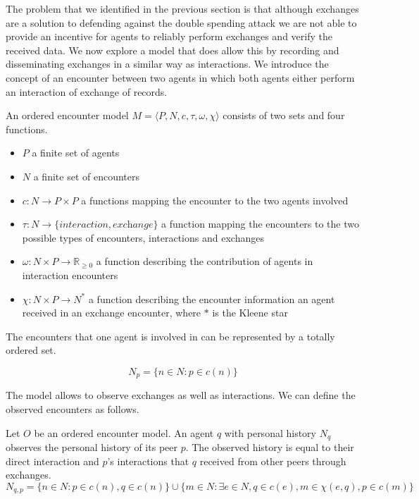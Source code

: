 The problem that we identified in the previous section is that although exchanges are a solution to
defending against the double spending attack we are not able to provide an incentive for agents to 
reliably perform exchanges and verify the received data. We now explore a model that does allow this
by recording and disseminating exchanges in a similar way as interactions. We introduce the concept
of an encounter between two agents in which both agents either perform an interaction of exchange 
of records.

\begin{defn}
    An ordered encounter model $M = \langle P, N, c, \tau, \omega, \chi \rangle$ consists of two 
    sets and four functions.
    \begin{itemize}
        \item $P$ a finite set of agents
        \item $N$ a finite set of encounters
        \item $c : N \rightarrow P \times P$ a functions mapping the encounter to the two agents involved
        \item $\tau : N \rightarrow \{\textit{interaction}, \textit{exchange}\}$ a function mapping 
        the encounters to the two possible types of encounters, interactions and exchanges
        \item $\omega : N \times P \rightarrow \mathbb{R}_{\geq0}$ a function describing the contribution
        of agents in interaction encounters
        \item $\chi : N \times P \rightarrow N^*$ a function describing the encounter information an 
        agent received in an exchange encounter, where $*$ is the Kleene star
    \end{itemize}
\end{defn}

The encounters that one agent is involved in can be represented by a totally ordered set.

\[ N_p = \{ n \in N : p \in c(n) \}\]

The model allows to observe exchanges as well as interactions. We can define the observed encounters
as follows.

\begin{defn} 
    \label{def:peer_history}
    Let $O$ be an ordered encounter model. An agent $q$ with personal history $N_q$ 
    observes the personal history of its peer $p$. The observed history is equal to their direct 
    interaction and $p$'s interactions that $q$ received from other peers through exchanges.
    \[ N_{q,p} = \{ n \in N : p \in c(n), q \in c(n) \} \cup \{ m \in N : \exists e \in N, q \in c(e), m \in \chi(e, q), p \in c(m)\}\]
\end{defn}

